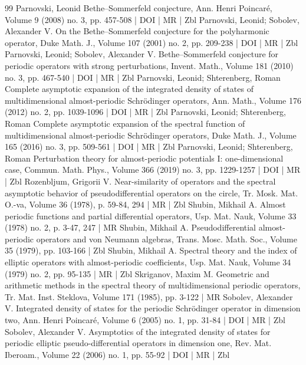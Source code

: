 \begin{thebibliography}{99}
Parnovski, Leonid Bethe–Sommerfeld conjecture, Ann. Henri Poincaré, Volume 9 (2008) no. 3, pp. 457-508 | DOI | MR | Zbl
Parnovski, Leonid; Sobolev, Alexander V. On the Bethe–Sommerfeld conjecture for the polyharmonic operator, Duke Math. J., Volume 107 (2001) no. 2, pp. 209-238 | DOI | MR | Zbl
Parnovski, Leonid; Sobolev, Alexander V. Bethe–Sommerfeld conjecture for periodic operators with strong perturbations, Invent. Math., Volume 181 (2010) no. 3, pp. 467-540 | DOI | MR | Zbl
Parnovski, Leonid; Shterenberg, Roman Complete asymptotic expansion of the integrated density of states of multidimensional almost-periodic Schrödinger operators, Ann. Math., Volume 176 (2012) no. 2, pp. 1039-1096 | DOI | MR | Zbl
Parnovski, Leonid; Shterenberg, Roman Complete asymptotic expansion of the spectral function of multidimensional almost-periodic Schrödinger operators, Duke Math. J., Volume 165 (2016) no. 3, pp. 509-561 | DOI | MR | Zbl
Parnovski, Leonid; Shterenberg, Roman Perturbation theory for almost-periodic potentials I: one-dimensional case, Commun. Math. Phys., Volume 366 (2019) no. 3, pp. 1229-1257 | DOI | MR | Zbl
Rozenbljum, Grigorii V. Near-similarity of operators and the spectral asymptotic behavior of pseudodifferential operators on the circle, Tr. Mosk. Mat. O.-va, Volume 36 (1978), p. 59-84, 294 | MR | Zbl
Shubin, Mikhail A. Almost periodic functions and partial differential operators, Usp. Mat. Nauk, Volume 33 (1978) no. 2, p. 3-47, 247 | MR
Shubin, Mikhail A. Pseudodifferential almost-periodic operators and von Neumann algebras, Trans. Mosc. Math. Soc., Volume 35 (1979), pp. 103-166 | Zbl
Shubin, Mikhail A. Spectral theory and the index of elliptic operators with almost-periodic coefficients, Usp. Mat. Nauk, Volume 34 (1979) no. 2, pp. 95-135 | MR | Zbl
Skriganov, Maxim M. Geometric and arithmetic methods in the spectral theory of multidimensional periodic operators, Tr. Mat. Inst. Steklova, Volume 171 (1985), pp. 3-122 | MR
Sobolev, Alexander V. Integrated density of states for the periodic Schrödinger operator in dimension two, Ann. Henri Poincaré, Volume 6 (2005) no. 1, pp. 31-84 | DOI | MR | Zbl
Sobolev, Alexander V. Asymptotics of the integrated density of states for periodic elliptic pseudo-differential operators in dimension one, Rev. Mat. Iberoam., Volume 22 (2006) no. 1, pp. 55-92 | DOI | MR | Zbl

\end{thebibliography}

